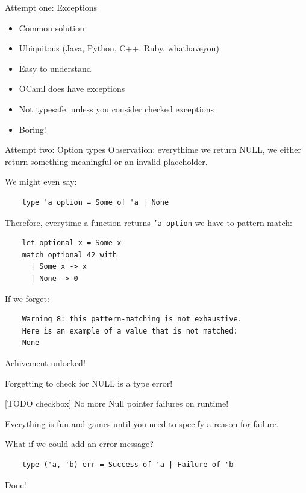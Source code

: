 \documentclass{beamer}
\begin{document}
\begin{frame}{Attempt one: Exceptions}
  \begin{itemize}
    \item Common solution
    \item Ubiquitous (Java, Python, C++, Ruby, whathaveyou)
    \item Easy to understand
    \item OCaml does have exceptions
    \pause
    \item \alert{Not typesafe}, unless you consider checked exceptions
    \item Boring!
  \end{itemize}
\end{frame}

\begin{frame}[fragile]{Attempt two: Option types}
  Observation: everythime we return NULL, we either return something
  meaningful or an invalid placeholder.

  We might even say:
  \begin{verbatim}
    type 'a option = Some of 'a | None
  \end{verbatim}

  \pause

  Therefore, everytime a function returns \texttt{'a option} we have
  to pattern match:
  \begin{verbatim}
    let optional x = Some x
    match optional 42 with
      | Some x -> x
      | None -> 0
  \end{verbatim}

  \pause

  If we forget:
  \begin{verbatim}
    Warning 8: this pattern-matching is not exhaustive.
    Here is an example of a value that is not matched:
    None
  \end{verbatim}
\end{frame}

\begin{frame}{Achivement unlocked!}
  \begin{center}
    {\Huge Forgetting to check for NULL is a type error!}
  \end{center}
  [TODO checkbox] No more Null pointer failures on runtime!
\end{frame}

\begin{frame}[fragile]
  Everything is fun and games until you need to specify a reason for
  failure.

  What if we could add an error message?
  \begin{verbatim}
    type ('a, 'b) err = Success of 'a | Failure of 'b
  \end{verbatim}
  Done!
\end{frame}
\end{document}
